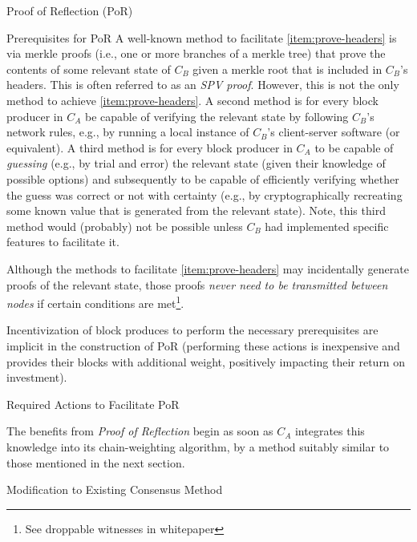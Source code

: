 \begin{section}{Proof of Reflection (PoR)}
\begin{subsection}{Prerequisites for PoR}
     A well-known method to facilitate \autoref{item:prove-headers} is via merkle proofs (i.e., one or more branches of a merkle tree) that prove the contents of some relevant state of $C_B$ given a merkle root that is included in $C_B$'s headers. This is often referred to as an \emph{SPV proof}. However, this is not the only method to achieve \autoref{item:prove-headers}. A second method is for every block producer in $C_A$ be capable of verifying the relevant state by following $C_B$'s network rules, e.g., by running a local instance of $C_B$'s client-server software (or equivalent). A third method is for every block producer in $C_A$ to be capable of \emph{guessing} (e.g., by trial and error) the relevant state (given their knowledge of possible options) and subsequently to be capable of efficiently verifying whether the guess was correct or not with certainty (e.g., by cryptographically recreating some known value that is generated from the relevant state). Note, this third method would (probably) not be possible unless $C_B$ had implemented specific features to facilitate it.

     Although the methods to facilitate \autoref{item:prove-headers} may incidentally generate proofs of the relevant state, those proofs \emph{never need to be transmitted between nodes} if certain conditions are met\footnote{See droppable witnesses in whitepaper}.

     Incentivization of block produces to perform the necessary prerequisites are implicit in the construction of PoR (performing these actions is inexpensive and provides their blocks with additional weight, positively impacting their return on investment).

 \end{subsection}
 \begin{subsection}{Required Actions to Facilitate PoR}

     The benefits from \emph{Proof of Reflection} begin as soon as $C_A$ integrates this knowledge into its chain-weighting algorithm, by a method suitably similar to those mentioned in the next section.

 \end{subsection}
 \begin{subsection}{Modification to Existing Consensus Method}


\end{subsection}
\end{section}
